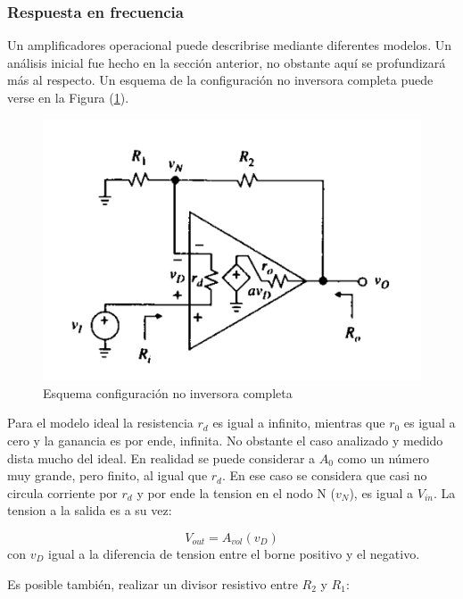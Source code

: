 \subsubsection{Respuesta en frecuencia}

Un amplificadores operacional puede describrise mediante diferentes modelos. Un análisis inicial fue hecho en la sección anterior, no obstante aquí se profundizará más al respecto. Un esquema de la configuración no inversora completa puede verse en la Figura (\ref{fig:esquema_no_inversor}). 

\begin{figure}[H]	
	\centering
	\includegraphics[width=\textwidth]{Ejercicio2/Imagenes/Rin_no_inversor.png}
	\caption{Esquema configuración no inversora completa}
	\label{fig:esquema_no_inversor}
\end{figure}

Para el modelo ideal la resistencia $r_d$ es igual a infinito, mientras que $r_0$ es igual a cero y la ganancia es por ende, infinita. No obstante el caso analizado y medido dista mucho del ideal. En realidad se puede considerar a $A_0$ como un número muy grande, pero finito, al igual que $r_d$. En ese caso se considera que casi no circula corriente por $r_d$ y por ende la tension en el nodo N ($v_N$), es igual a $V_{in}$. La tension a la salida es a su vez:

\begin{equation}\label{eq:ganancia}
V_{out} = A_{vol}(v_D)
\end{equation}
con $v_D$ igual a la diferencia de tension entre el borne positivo y el negativo. 

Es posible también, realizar un divisor resistivo entre $R_2$ y $R_1$:

